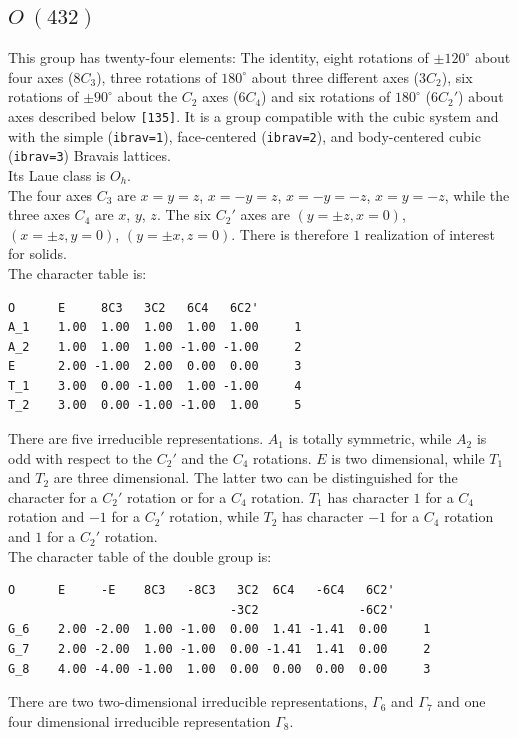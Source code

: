 \documentclass[12pt,a4paper]{article}
\begin{document}
\newpage
\subsection{\color{web-blue}$O\ (432)$} 
This group has twenty-four elements: The identity, eight rotations 
of $\pm120^\circ$ about four axes ($8C_3$), three rotations of 
$180^\circ$ about three different axes ($3C_2$), six
rotations of $\pm90^\circ$ about the $C_2$ axes ($6C_4$) and
six rotations of $180^\circ$ ($6C_2'$) about axes described below
\texttt{[135]}.
It is a group compatible with the cubic system and with the  
simple (\texttt{ibrav=1}), face-centered (\texttt{ibrav=2}), 
and body-centered cubic (\texttt{ibrav=3}) Bravais lattices. \\
Its Laue class is $O_{h}$. \\
The four axes $C_3$ are $x=y=z$, $x=-y=z$, $x=-y=-z$, $x=y=-z$, while
the three axes $C_4$ are $x$, $y$, $z$. 
The six $C_2'$ axes are $(y=\pm z, x=0)$, $(x=\pm z, y=0)$, $(y=\pm x, z=0)$.
There is therefore $1$ realization of interest for solids. \\
The character table is:
\begin{verbatim}
O      E     8C3   3C2   6C4   6C2' 
A_1    1.00  1.00  1.00  1.00  1.00     1
A_2    1.00  1.00  1.00 -1.00 -1.00     2
E      2.00 -1.00  2.00  0.00  0.00     3
T_1    3.00  0.00 -1.00  1.00 -1.00     4
T_2    3.00  0.00 -1.00 -1.00  1.00     5
\end{verbatim}
There are five irreducible representations. $A_1$ is totally symmetric,
while $A_2$ is odd with respect to the $C_2'$ and the $C_4$ rotations.
$E$ is two dimensional, while $T_1$ and $T_2$ are three dimensional. The
latter two can be distinguished for the character for a $C_2'$ rotation
or for a $C_4$ rotation. $T_1$ has character $1$ for a $C_4$ rotation and
$-1$ for a $C_2'$ rotation, while $T_2$ has character $-1$ for a $C_4$ rotation
and $1$ for a $C_2'$ rotation. \\
The character table of the double group is:
\begin{verbatim}
O      E     -E    8C3   -8C3   3C2  6C4   -6C4   6C2'
                               -3C2              -6C2'
G_6    2.00 -2.00  1.00 -1.00  0.00  1.41 -1.41  0.00     1
G_7    2.00 -2.00  1.00 -1.00  0.00 -1.41  1.41  0.00     2
G_8    4.00 -4.00 -1.00  1.00  0.00  0.00  0.00  0.00     3
\end{verbatim}
There are two two-dimensional irreducible representations, $\Gamma_6$ and
$\Gamma_7$ and one four dimensional irreducible representation $\Gamma_8$.
\end{document}
